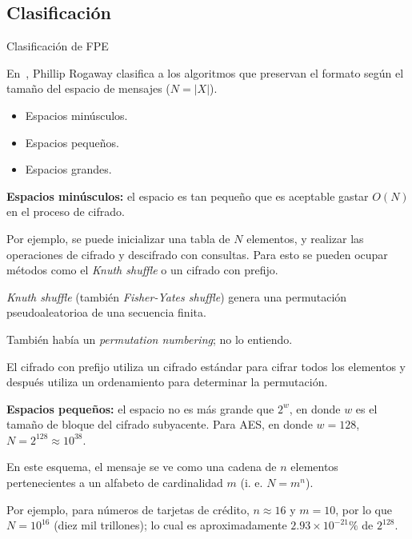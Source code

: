 %
%

\subsection{Clasificación}

\begin{frame}{Clasificación de FPE}

  En~\cite{sinopsis_rogaway}, Phillip Rogaway clasifica a los algoritmos que
  preservan el formato según el tamaño del espacio de mensajes ($ N = |X| $).

  \begin{itemize}
    \item Espacios minúsculos.
    \item Espacios pequeños.
    \item Espacios grandes.
  \end{itemize}

  {
    \textbf{Espacios minúsculos:} el espacio es tan pequeño que es aceptable
    gastar $ O(N) $ en el proceso de cifrado.

    Por ejemplo, se puede inicializar una tabla de $ N $ elementos, y realizar
    las operaciones de cifrado y descifrado con consultas. Para esto se pueden
    ocupar métodos como el \textit{Knuth shuffle} o un cifrado con prefijo.
  }

  {
    \textit{Knuth shuffle} (también \textit{Fisher-Yates shuffle}) genera una
    permutación pseudoaleatorioa de una secuencia finita.

    También había un \textit{permutation numbering}; no lo entiendo.

    El cifrado con prefijo utiliza un cifrado estándar para cifrar todos los
    elementos y después utiliza un ordenamiento para determinar la permutación.
  }

  {
    \textbf{Espacios pequeños:} el espacio no es más grande que $ 2^w $, en
    donde $ w $ es el tamaño de bloque del cifrado subyacente. Para AES, en
    donde $ w = 128 $, $ N = 2^{128} \approx 10^{38} $.

    En este esquema, el mensaje se ve como una cadena de $ n $ elementos
    pertenecientes a un alfabeto de cardinalidad $ m $ (i. e. $ N = m^n $).

    Por ejemplo, para números de tarjetas de crédito, $ n \approx 16 $ y
    $ m = 10 $, por lo que $ N = 10^{16} $ (diez mil trillones); lo cual es
    aproximadamente $ 2.93 \times 10^{-21} \% $ de $ 2^{128} $.
  }


\end{frame}
